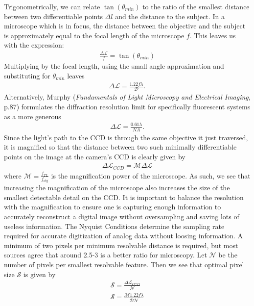 Trigonometrically, we can relate $\tan(\theta_{min})$ to the ratio of the smallest distance between two differentiable points $\Delta l$ and the distance to the subject. In a microscope which is in focus, the distance between the objective and the subject is approximately equal to the focal length of the microscope $f$. This leaves us with the expression:
\begin{gather}
   \frac{ \Delta \mathcal{L}}{f}= \tan(\theta_{min})
\end{gather}
Multiplying by the focal length, using the small angle approximation and substituting for $\theta_{min}$ leaves
\begin{gather}
    \Delta \mathcal{L} = \frac{1.22f\lambda}{\mathcal{D}}.
\end{gather}
Alternatively, Murphy (\textit{Fundamentals of Light Microscopy and Electrical Imaging}, p.87) formulates the diffraction resolution limit for specifically fluorescent systems as a more generous
\begin{gather}
    \Delta \mathcal{L}=\frac{0.61\lambda}{NA}.
\end{gather}
Since the light's path to the CCD is through the same objective it just traversed, it is magnified so that the distance between two such minimally differentiable points on the image at the camera's CCD is clearly given by 
\begin{gather}
    \Delta \mathcal{L}_{CCD} = \mathcal{M} \Delta \mathcal{L}
\end{gather}
where $\mathcal{M}=\frac{f_{TL}}{f_{obj}}$ is the magnification power of the microscope. As such, we see that increasing the magnification of the microscope also increases the size of the smallest detectable detail on the CCD. It is important to balance the resolution with the magnification to ensure one is capturing enough information to accurately reconstruct a digital image without oversampling and saving lots of useless information.
The Nyquist Conditions determine the sampling rate required for accurate digitization of analog data without loosing information. A minimum of two pixels per minimum resolvable distance is required, but most sources agree that around 2.5-3 is a better ratio for microscopy.
Let $\mathcal{N}$ be the number of pixels per smallest resolvable feature. Then we see that optimal pixel size $\mathcal{S}$ is given by
\begin{gather}
    \mathcal{S} = \frac{\Delta \mathcal{L}_{CCD}}{\mathcal{N}}\\
    \mathcal{S} = \frac{\mathcal{M} 1.22f\lambda}{\mathcal{D}\mathcal{N}}
\end{gather}
